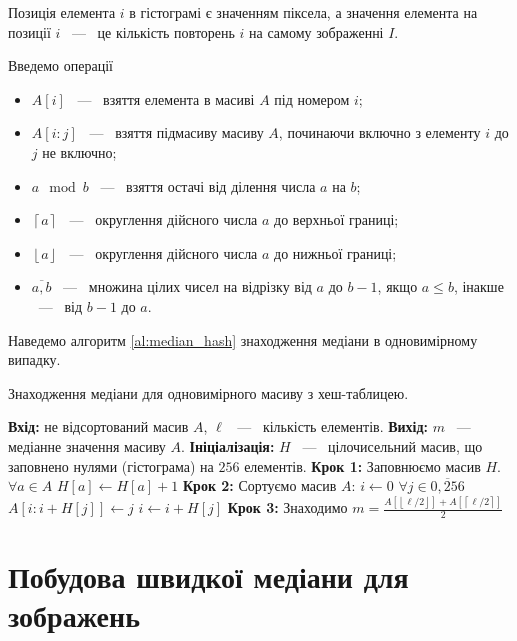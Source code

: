 Позиція елемента $i$ в гістограмі є значенням піксела, а значення елемента на позиції $i$ ~---~ це
кількість повторень $i$ на самому зображенні $I$.

Введемо операції
\begin{itemize}
    \item $A[i]$ ~---~ взяття елемента в масиві $A$ під номером $i$;
    \item $A[i:j]$ ~---~ взяття підмасиву масиву $A$, починаючи включно з елементу $i$ до $j$ не включно;
    \item $a \mod b$ ~---~ взяття остачі від ділення числа $a$ на $b$;
    \item $\left\lceil a \right\rceil$ ~---~ округлення дійсного числа $a$ до верхньої границі;
    \item $\left\lfloor a \right\rfloor$ ~---~ округлення дійсного числа $a$ до нижньої границі;
    \item $\overline{a,b}$ ~---~ множина цілих чисел на відрізку від $a$ до $b-1$, якщо $a \le b$,
          інакше  ~---~ від $b-1$ до $a$.
\end{itemize}
Наведемо алгоритм \ref{al:median_hash} знаходження медіани в одновимірному випадку.

\begin{algorithm}[H]
    \caption{Знаходження медіани для одновимірного масиву з хеш-таблицею.}
    \begin{algorithmic}
        \State \textbf{Вхід:} не відсортований масив $A$, $\ell$ ~---~ кількість елементів.
        \State \textbf{Вихід:} $m$ ~---~ медіанне значення масиву $A$.
        \State \textbf{Ініціалізація:} $H$ ~---~ цілочисельний масив, що заповнено нулями (гістограма) на $256$ елементів.
        \State \textbf{Крок 1:} Заповнюємо масив $H$.
        \State $\forall a \in A$
        \State \qquad $ H[a] \gets H[a] + 1 $
        \State \textbf{Крок 2:} Сортуємо масив $ A $:
        \State $ i \gets 0 $
        \State $ \forall j \in \overline{0,256} $
        \State \qquad  $ A[i:i+H[j]] \gets j $
        \State \qquad  $ i \gets i + H[j] $
        \State \textbf{Крок 3:} Знаходимо $m = \frac{A[  \left\lfloor \ell/2 \right\rfloor   ] + A[\left\lceil \ell/2 \right\rceil ]}{2} $
    \end{algorithmic}
    \label{al:median_hash}
\end{algorithm}

\section{Побудова швидкої медіани для зображень}

